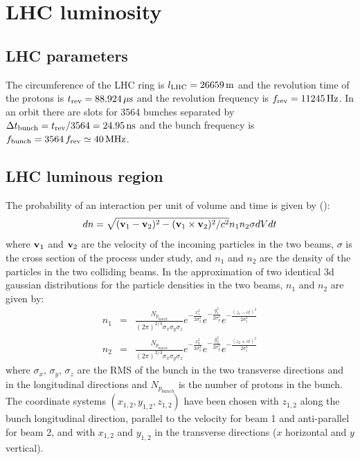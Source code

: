 \documentclass[10pt]{article}
\begin{document}
\gitHash
\section{LHC luminosity}
%
\subsection{LHC parameters}
The circumference of the LHC ring is $l_{\rm LHC}=26659\,{\rm m}$ and the revolution time of the protons is $t_{\rm rev}=88.924\,\mu{\rm s}$ and the revolution frequency is $f_{\rm rev}=11245\,{\rm Hz}$. In an orbit there are slots for 3564 bunches separated by $\Delta t_{\rm bunch} = t_{\rm rev}/3564 = 24.95\,{\rm ns}$ and the bunch frequency is $f_{\rm bunch} = 3564\,f_{\rm rev} \simeq 40\,{\rm MHz}$.
%
\subsection{LHC luminous region}
\label{sec:lr}
The probability of an interaction per unit of volume and time is given by (\cite{bib:LandauFT}):
\begin{equation}
dn = \sqrt{({\bf v}_1-{\bf v}_2)^2-({\bf v}_1\times{\bf v}_2)^2/c^2}n_1n_2\sigma dVdt
\end{equation}
where ${\bf v}_1$ and ${\bf v}_2$ are the velocity of the incoming particles in the two beams, $\sigma$ is the cross section of the process under study, and $n_1$ and $n_2$ are the density of the particles in the two colliding beams.
In the approximation of two identical 3d gaussian distributions for the particle densities in the two beams, $n_1$ and $n_2$ are given by:
\begin{eqnarray}
n_1&=&\frac{N_{p_{bunch}}}{(2\pi)^{2/3}\sigma_x\sigma_y\sigma_z}e^{-\frac{x_1^2}{2\sigma_x^2}}e^{-\frac{y_1^2}{2\sigma_y^2}}e^{-\frac{(z_1-ct)^2}{2\sigma_z^2}} \\
n_2&=&\frac{N_{p_{bunch}}}{(2\pi)^{2/3}\sigma_x\sigma_y\sigma_z}e^{-\frac{x_2^2}{2\sigma_x^2}}e^{-\frac{y_2^2}{2\sigma_y^2}}e^{-\frac{(z_2+ct)^2}{2\sigma_z^2}}
\end{eqnarray}
where $\sigma_x,\,\sigma_y,\,\sigma_z$ are the RMS of the bunch in the two transverse directions and in the longitudinal directions and $N_{p_{bunch}}$ is the number of protons in the bunch. The coordinate systems $(x_{1,2},y_{1,2},z_{1,2})$ have been chosen with $z_{1,2}$ along the bunch longitudinal direction, parallel to the velocity for beam 1 and anti-parallel for beam 2, and with $x_{1,2}$ and $y_{1,2}$ in the transverse directions ($x$ horizontal and $y$ vertical).
\end{document}

